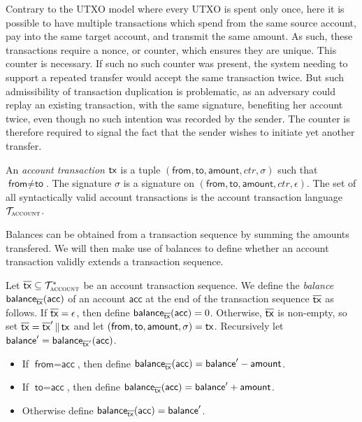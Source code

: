 Contrary to the UTXO model where every UTXO is spent only once, here it is
possible to have multiple transactions which spend from the same source account,
pay into the same target account, and transmit the same amount. As such, these
transactions require a nonce, or counter, which ensures they are unique. This
counter is necessary. If such no such counter was present, the system needing to
support a repeated transfer would accept the same transaction twice. But such
admissibility of transaction duplication is problematic, as an adversary could
replay an existing transaction, with the same signature, benefiting her account
twice, even though no such intention was recorded by the sender. The counter is
therefore required to signal the fact that the sender wishes to initiate yet
another transfer.

\begin{definition}
  An \emph{account transaction} $\mathsf{tx}$ is a tuple
  $(\textsf{from},\allowbreak
   \textsf{to},\allowbreak
   \textsf{amount},\allowbreak
   ctr,\allowbreak
   \sigma)$ such that $\textsf{from} \neq \textsf{to}$.
  The signature $\sigma$ is a signature on
  $(\textsf{from},\allowbreak
    \textsf{to},\allowbreak
    \textsf{amount},\allowbreak
    ctr,\allowbreak
    \epsilon)$. The set of all
  syntactically valid account transactions is the account transaction language
  $\mathcal{T}_\textsc{account}$.
\end{definition}

Balances can be obtained from a transaction sequence by summing the amounts
transfered. We will then make use of balances to define whether an account
transaction validly extends a transaction sequence.

\begin{definition}
  Let $\overline{\mathsf{tx}} \subseteq \mathcal{T}_\textsc{account}^*$ be an account
  transaction sequence. We define the \emph{balance}
  $\textsf{balance}_{\overline{\mathsf{tx}}}(\textsf{acc})$
  of an account $\textsf{acc}$
  at the end of the transaction sequence $\overline{\mathsf{tx}}$
  as follows. If $\overline{\mathsf{tx}} = \epsilon$, then define
  $\textsf{balance}_{\overline{\mathsf{tx}}}(\textsf{acc}) = 0$.
  Otherwise, $\overline{\mathsf{tx}}$ is non-empty, so set
  $\overline{\mathsf{tx}} = \overline{\mathsf{tx}}'\,\|\,\mathsf{tx}$
  and let $(\textsf{from}, \textsf{to}, \textsf{amount}, \sigma) = \mathsf{tx}$.
  Recursively let
  $\textsf{balance}' = \textsf{balance}_{\overline{\mathsf{tx}}'}(\textsf{acc})$.
  \begin{itemize}
    \item If $\textsf{from} = \textsf{acc}$, then define
          $\textsf{balance}_{\overline{\mathsf{tx}}}(\textsf{acc}) = \textsf{balance}' - \textsf{amount}$.
    \item If $\textsf{to} = \textsf{acc}$, then define
          $\textsf{balance}_{\overline{\mathsf{tx}}}(\textsf{acc}) = \textsf{balance}' + \textsf{amount}$.
    \item Otherwise
          define $\textsf{balance}_{\overline{\mathsf{tx}}}(\textsf{acc}) = \textsf{balance}'$.
\end{itemize}
\end{definition}

